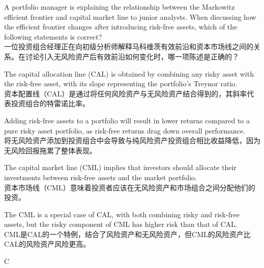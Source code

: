 \documentclass{article}
\newcounter{question} %
\begin{document}
\begin{question}
    A portfolio manager is explaining the relationship between the Markowitz efficient frontier and capital market line to junior analysts. When discussing how the efficient frontier changes after introducing risk-free assets, which of the following statements is correct?
    \\
    一位投资组合经理正在向初级分析师解释马科维茨有效前沿和资本市场线之间的关系。在讨论引入无风险资产后有效前沿如何变化时，哪一项陈述是正确的？
    \end{question}
    
    \begin{choices}
        \item The capital allocation line (CAL) is obtained by combining any risky asset with the risk-free asset, with its slope representing the portfolio's Treynor ratio.
        \\
        资本配置线（CAL）是通过将任何风险资产与无风险资产结合得到的，其斜率代表投资组合的特雷诺比率。
        \item Adding risk-free assets to a portfolio will result in lower returns compared to a pure risky asset portfolio, as risk-free returns drag down overall performance.
        \\
        将无风险资产添加到投资组合中会导致与纯风险资产投资组合相比收益降低，因为无风险回报拖累了整体表现。
        \item The capital market line (CML) implies that investors should allocate their investments between risk-free assets and the market portfolio.
        \\
        资本市场线（CML）意味着投资者应该在无风险资产和市场组合之间分配他们的投资。
        \item The CML is a special case of CAL, with both combining risky and risk-free assets, but the risky component of CML has higher risk than that of CAL.
        \\
        CML是CAL的一个特例，结合了风险资产和无风险资产，但CML的风险资产比CAL的风险资产风险更高。
    \end{choices}
    
    \begin{correctanswer}
    C
    \end{correctanswer}
    
\end{document}
